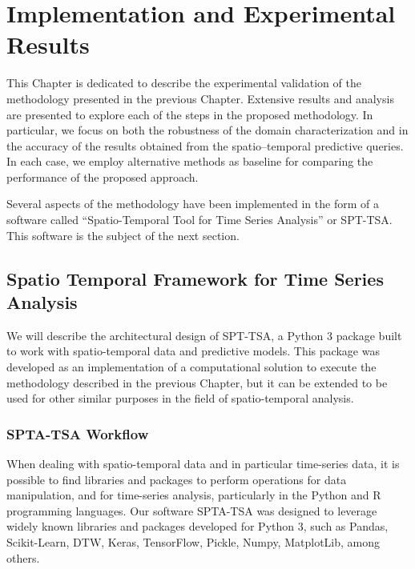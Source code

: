 \chapter{Implementation and Experimental Results}
\label{chapter_Experimental_Results}

This Chapter is dedicated to describe the experimental validation of the methodology presented in the previous Chapter. Extensive results and analysis are presented to explore each of the steps in the proposed methodology. In particular, we focus on both the robustness of the domain characterization and in the accuracy of the results obtained from the spatio--temporal predictive queries. In each case, we employ alternative methods as baseline for comparing the performance of the proposed approach.

Several aspects of the methodology have been implemented in the form of a software called ``Spatio-Temporal Tool for Time Series Analysis'' or SPT-TSA. This software is the subject of the next section.

\section{Spatio Temporal Framework for Time Series Analysis}       

We will describe the architectural design of SPT-TSA, a Python 3 package built to work with spatio-temporal data and predictive models. This package was developed as an implementation of a computational solution to execute the methodology described in the previous Chapter, but it can be extended to be used for other similar purposes in the field of spatio-temporal analysis.

\subsection{SPTA-TSA Workflow}

When dealing with spatio-temporal data and in particular time-series data, it is possible to find libraries and packages to perform operations for data manipulation, and for time-series analysis, particularly in the Python and R programming languages. Our software SPTA-TSA was designed to leverage widely known libraries and packages developed for Python 3, such as Pandas, Scikit-Learn, DTW, Keras, TensorFlow, Pickle, Numpy, MatplotLib, among others.

